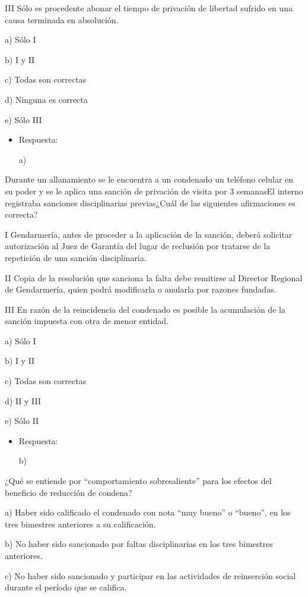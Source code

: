 \documentclass[letterpaper, 11pt]{article}
\begin{document}
III Sólo es procedente abonar el tiempo de privación de libertad
sufrido en una causa terminada en absolución.


a) Sólo I

b) I y II

c) Todas son correctas

d) Ninguna es correcta

e) Sólo III

\begin{itemize}
\item Respuesta:

a)
\end{itemize}


Durante un allanamiento se le encuentra a un condenado un teléfono
celular en su poder y se le aplica una sanción de privación de visita
por 3 semanasEl interno registraba sanciones disciplinarias
previas¿Cuál de las siguientes afirmaciones es correcta?

I Gendarmería, antes de proceder a la aplicación de la sanción, deberá
solicitar autorización al Juez de Garantía del lugar de reclusión por
tratarse de la repetición de una sanción disciplinaria.

II Copia de la resolución que sanciona la falta debe remitirse al
Director Regional de Gendarmería, quien podrá modificarla o anularla
por razones fundadas.

III En razón de la reincidencia del condenado es posible la
acumulación de la sanción impuesta con otra de menor entidad.


a) Sólo I

b) I y II

c) Todas son correctas

d) II y III

e) Sólo II

\begin{itemize}
\item Respuesta:

b)
\end{itemize}


¿Qué se entiende por “comportamiento sobresaliente” para los efectos
del beneficio de reducción de condena?

a) Haber sido calificado el condenado con nota “muy bueno” o “bueno”,
en los tres bimestres anteriores a su calificación.

b) No haber sido sancionado por faltas disciplinarias en los tres
bimestres anteriores.

c) No haber sido sancionado y participar en las actividades de
reinserción social durante el período que se califica.
\end{document}
